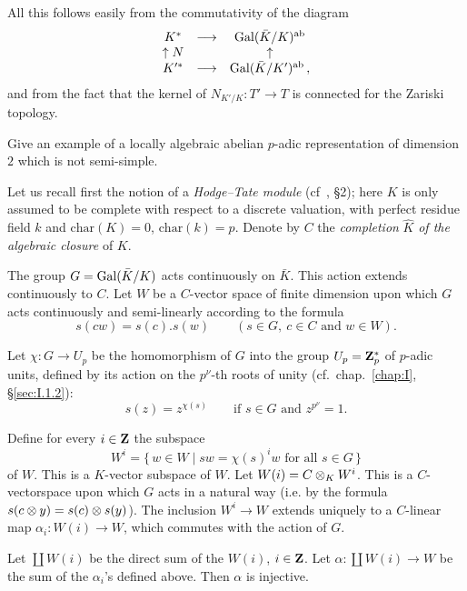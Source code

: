 All this follows easily from the commutativity of the diagram
\[
\begin{array}{ccc}
K^* & \longrightarrow & \mathrm{Gal}(\bar K/K)^{\mathrm{ab}}\\
\uparrow N & & \uparrow\\
K'^* & \longrightarrow & \mathrm{Gal}(\bar K/K')^{\mathrm{ab}}\,,
\end{array}
\]
and from the fact that the kernel of $N_{K'/K}\colon T' \to T$ is
connected for the Zariski topology.


Give an example of a locally algebraic abelian $p$-adic representation
of dimension $2$ which is not semi-simple.


Let us recall first the notion of a \emph{Hodge--Tate module}
(cf~\cite{serre-galpdiv}, \S2); here $K$ is only assumed to be complete
with respect to a discrete valuation, with perfect residue field $k$
and $\mathrm{char}(K) = 0$, $\mathrm{char}(k) = p$.  Denote by $C$ the
\emph{completion} $\hat K$ \emph{of the algebraic closure} of $K$.

The group $G = \mathrm{Gal}(\bar K/K)$ acts continuously on $\bar K$.  This
action extends continuously to $C$.  Let $W$ be a $C$-vector space of
finite dimension upon which $G$ acts continuously and semi-linearly
according to the formula
\[
s(cw) = s(c).s(w) \qquad (s \in G,\ c \in C \text{ and } w \in W).
\]

Let $\chi\colon G \to U_p$ be the homomorphism of $G$ into the group
$U_p = \mathbf{Z}_p^*$ of $p$-adic units, defined by its action on the
$p^\nu$-th roots of unity (cf.~chap.~\ref{chap:I},
\S\ref{sec:I.1.2}):
\[
s(z) = z^{\chi(s)} \qquad \text{if } s \in G \text{ and }
z^{p^\nu} = 1.
\]

Define for every $i \in \mathbf{Z}$ the subspace
\[
W^i = \{\, w \in W \mid sw = \chi(s)^i w \text{ for all } s \in G \,\}
\]
of $W$.  This is a $K$-vector subspace of $W$.  Let
$W(i) = C \mathbin{\otimes}_K W^i$.  This is a $C$-vectorspace upon which $G$ acts
in a natural way (i.e. by the formula $s(c \mathbin{\otimes} y) = s(c) \mathbin{\otimes}
s(y)$).  The inclusion $W^i \to W$ extends uniquely to a $C$-linear map
$\alpha_i\colon W(i) \to W$, which commutes with the action of $G$.

\begin{proposition}
Let $\coprod W(i)$ be the direct sum of the $W(i)$, $i \in \mathbf{Z}$.  Let
$\alpha\colon \coprod W(i) \to W$ be the sum of the $\alpha_i$'s
defined above.  Then $\alpha$ is injective.
\end{proposition}

